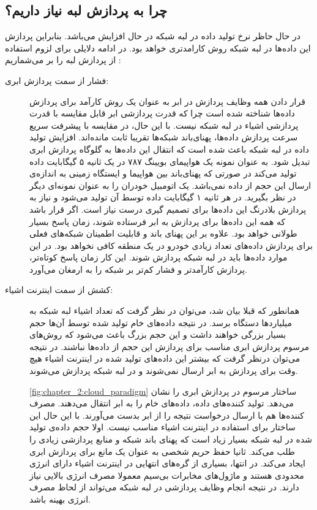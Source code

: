     \subsection{چرا به پردازش لبه نیاز داریم؟}
      در حال حاظر نرخ تولید داده در لبه شبکه در حال افزایش می‌باشد.
      بنابراین پردازش این داده‌ها در لبه شبکه روش کارامدتری خواهد بود.
      در ادامه دلایلی برای لزوم استفاده از پردازش لبه را بر می‌شماریم \cite{shi2016edge}:
      \begin{description}
        \item [فشار از سمت پردازش ابری:]
          قرار دادن همه وظایف پردازش در ابر به عنوان یک روش کارآمد برای پردازش داده‌ها شناخته شده است چرا که قدرت پردازشی ابر قابل مقایسه با قدرت پردازشی اشیاء در لبه شبکه نیست.
          با این حال، در مقایسه با پیشرفت سریع سرعت پردازش داده‌ها، پهنای‌باند شبکه‌ها تقریبا ثابت مانده‌اند.
          افزایش تولید داده در لبه شبکه باعث شده است که انتقال این داده‌ها به گلوگاه پردازش ابری تبدیل شود.
          به عنوان نمونه یک هواپیما‌ی بویینگ ۷۸۷ در یک ثانیه ۵ گیگابایت داده تولید می‌کند در صورتی که پهنای‌باند بین هواپیما و ایستگاه زمینی به اندازه‌ی ارسال این حجم از داده نمی‌باشد.
          یک اتومبیل خودران را به عنوان نمونه‌ای دیگر در نظر بگیرید.
          در هر ثانیه ۱ گیگابایت داده توسط آن تولید می‌شود و نیاز به پردازش بلادرنگ این داده‌ها برای تصمیم گیری درست نیاز است.
          اگر قرار باشد که همه این داده‌ها برای پردازش به ابر فرستاده شوند، زمان پاسخ بسیار طولانی خواهد بود.
          علاوه بر این پهنای باند و قابلیت اطمینان شبکه‌های فعلی برای پردازش داده‌‌های تعداد زیادی خودرو در یک منطقه کافی نخواهد بود.
          در این موارد داده‌ها باید در لبه شبکه پردازش شوند.
          این کار زمان پاسخ کوتاه‌تر، پردازش کارآمد‌تر و فشار کم‌تر بر شبکه را به ارمغان می‌آورد.

        \item [کشش از سمت اینترنت اشیاء:]
          همانطور که قبلا بیان شد، می‌توان در نظر گرفت که تعداد اشیاء لبه شبکه به میلیارد‌ها دستگاه برسد.
          در نتیجه داده‌های خام تولید شده توسط آن‌ها حجم بسیار بزرگی خواهند داشت و این حجم بزرگ باعث می‌شود که روش‌های مرسوم پردازش ابری مناسب برای پردازش این حجم از داده‌ها نباشند.
          در نتیجه می‌توان درنظر گرفت که بیشتر این داده‌های تولید شده در اینترنت اشیاء هیچ وقت برای پردازش به ابر ارسال نمی‌شوند و در لبه شبکه پردازش می‌شوند.

          \cref{fig:chapter_2:cloud_paradigm} ساختار مرسوم در پردازش ابری را نشان می‌دهد.
          تولید کننده‌های داده، داده‌های خام را به ابر انتقال می‌دهند.
          مصرف کننده‌ها هم با ارسال درخواست نتیجه را از ابر بدست می‌آورند.
          با این حال این ساختار برای استفاده در اینترنت اشیاء مناسب نیست.
          اولا حجم داده‌ی تولید شده در لبه شبکه بسیار زیاد است که پهنای باند شبکه و منابع پردازشی زیادی را طلب می‌کند.
          ثانیا حفظ حریم شخصی به عنوان یک مانع برای پردازش ابری ایجاد می‌کند.
          در انتها، بسیاری از گره‌های انتهایی در اینترنت اشیاء دارای انرژی محدودی هستند و ماژول‌های مخابرات بی‌سیم معمولا مصرف انرژی بالایی نیاز دارند.
          در نتیجه انجام وظایف پردازشی در لبه شبکه می‌تواند از لحاظ مصرف انرژی بهینه‌ باشد.


\end{description}

